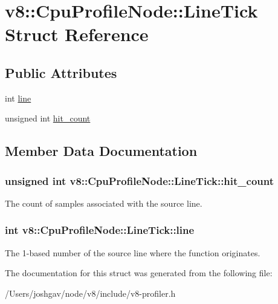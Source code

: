 \hypertarget{structv8_1_1_cpu_profile_node_1_1_line_tick}{}\section{v8\+:\+:Cpu\+Profile\+Node\+:\+:Line\+Tick Struct Reference}
\label{structv8_1_1_cpu_profile_node_1_1_line_tick}
\subsection*{Public Attributes}
\begin{DoxyCompactItemize}
\item 
int \hyperlink{structv8_1_1_cpu_profile_node_1_1_line_tick_af96fbdefbc07b2c84cf41d74555626f6}{line}
\item 
unsigned int \hyperlink{structv8_1_1_cpu_profile_node_1_1_line_tick_a62653fb1e6d381a5747d24b83aab1c1b}{hit\+\_\+count}
\end{DoxyCompactItemize}


\subsection{Member Data Documentation}
\subsubsection[{\texorpdfstring{hit\+\_\+count}{hit_count}}]{\setlength{\rightskip}{0pt plus 5cm}unsigned int v8\+::\+Cpu\+Profile\+Node\+::\+Line\+Tick\+::hit\+\_\+count}\hypertarget{structv8_1_1_cpu_profile_node_1_1_line_tick_a62653fb1e6d381a5747d24b83aab1c1b}{}\label{structv8_1_1_cpu_profile_node_1_1_line_tick_a62653fb1e6d381a5747d24b83aab1c1b}
The count of samples associated with the source line. 
\subsubsection[{\texorpdfstring{line}{line}}]{\setlength{\rightskip}{0pt plus 5cm}int v8\+::\+Cpu\+Profile\+Node\+::\+Line\+Tick\+::line}\hypertarget{structv8_1_1_cpu_profile_node_1_1_line_tick_af96fbdefbc07b2c84cf41d74555626f6}{}\label{structv8_1_1_cpu_profile_node_1_1_line_tick_af96fbdefbc07b2c84cf41d74555626f6}
The 1-\/based number of the source line where the function originates. 

The documentation for this struct was generated from the following file\+:\begin{DoxyCompactItemize}
\item 
/\+Users/joshgav/node/v8/include/v8-\/profiler.\+h\end{DoxyCompactItemize}
